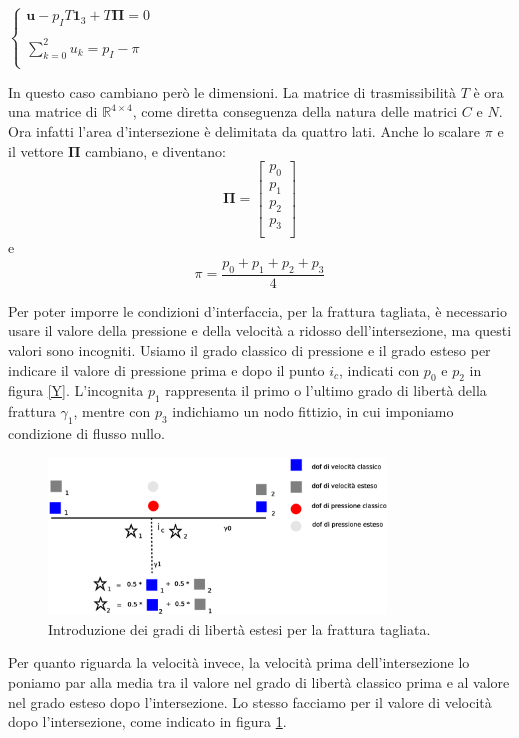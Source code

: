 \begin{center}			
	$\left \{
		\begin{array}{l}	
	 		\textbf{u} - p_{I}T\textbf{1}_{3}+T \boldsymbol{\Pi}=0  \\ \\
     	 	\displaystyle \sum_{k=0}^2 u_{k} = p_{I} - \pi  \\
		\end{array}
	\right.$
\end{center} \label{condizioni d'interfaccia y }

\noindent In questo caso cambiano però le dimensioni. La matrice di trasmissibilità $T$ è ora una matrice di $\mathbb{R}^{4 \times 4}$, come diretta conseguenza della natura delle matrici $C$ e $N$. Ora infatti l'area d'intersezione è delimitata da quattro lati. Anche lo scalare $\pi$ e il vettore $\boldsymbol{\Pi}$ cambiano, e diventano:
$$\boldsymbol{\Pi} = \left[ \begin{matrix}
 			p_0\\ 
 			p_1\\
 			p_2 \\ 
		 	p_3 \\
 			\end{matrix}\right] 
$$ 
 e
$$ \pi = \frac{p_0 + p_1 + p_2 + p_3 }{4} $$

Per poter imporre le condizioni d'interfaccia, per la frattura tagliata, è necessario usare il valore della pressione e della velocità a ridosso dell'intersezione, ma questi valori sono incogniti. 
Usiamo il grado classico di pressione e il grado esteso per indicare il valore di pressione prima e dopo il punto $i_c$, indicati con $p_0$ e $p_2$ in figura \ref{Y}.  L'incognita $p_1$ rappresenta il primo o l'ultimo grado di libertà della frattura $\gamma_1$, mentre con $p_3$ indichiamo un nodo fittizio, in cui imponiamo condizione di flusso nullo. 

\begin{figure}[htbp]
\begin{center}
\includegraphics[width=0.8\textwidth]{img/cap6/xfem.eps}
\caption{Introduzione dei gradi di libertà estesi per la frattura tagliata.}\label{xfem}
\end{center}
\end{figure}

\noindent Per quanto riguarda la velocità invece, la velocità prima dell'intersezione lo poniamo par alla media tra il valore nel grado di libertà classico prima e al valore nel grado esteso dopo l'intersezione. Lo stesso facciamo per il valore di velocità dopo l'intersezione, come indicato in figura \ref{xfem}. \\

